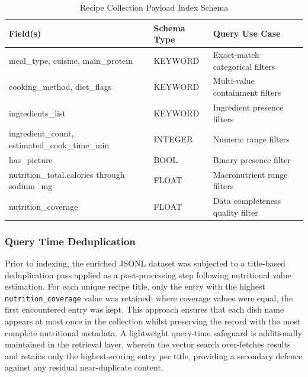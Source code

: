 \documentclass[conference]{IEEEtran}
\begin{document}
\begin{table}[H]
\caption{Recipe Collection Payload Index Schema}
\label{tab:payload_index_schema}
\centering
\footnotesize
\begin{tabular}{p{2.8cm} p{1.8cm} p{3.8cm}}
\toprule
\textbf{Field(s)} & \textbf{Schema Type} & \textbf{Query Use Case} \\
\midrule

meal\_type, cuisine, main\_protein &
KEYWORD &
Exact-match categorical filters \\

cooking\_method, diet\_flags &
KEYWORD &
Multi-value containment filters \\

ingredients\_list &
KEYWORD &
Ingredient presence filters \\

ingredient\_count, estimated\_cook\_time\_min &
INTEGER &
Numeric range filters \\

has\_picture &
BOOL &
Binary presence filter \\

nutrition\_total.calories through sodium\_mg &
FLOAT &
Macronutrient range filters \\

nutrition\_coverage &
FLOAT &
Data completeness quality filter \\

\bottomrule
\end{tabular}
\end{table}

\subsubsection{Query Time Deduplication}
Prior to indexing, the enriched JSONL dataset was subjected to a title-based deduplication pass applied as a post-processing step following nutritional value estimation. For each unique recipe title, only the entry with the highest \texttt{nutrition\_coverage} value was retained; where coverage values were equal, the first encountered entry was kept. This approach ensures that each dish name appears at most once in the collection whilst preserving the record with the most complete nutritional metadata. A lightweight query-time safeguard is additionally maintained in the retrieval layer, wherein the vector search over-fetches results and retains only the highest-scoring entry per title, providing a secondary defence against any residual near-duplicate content.
\end{document}
